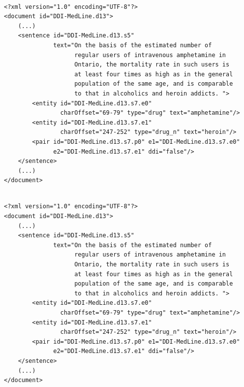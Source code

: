 \documentclass[xcolor={dvipsnames}]{beamer}
\begin{document}
\begin{frame}[fragile]{\insertsection}
\begin{verbatim}

<?xml version="1.0" encoding="UTF-8"?>
<document id="DDI-MedLine.d13">
    (...)
    <sentence id="DDI-MedLine.d13.s5" 
              text="On the basis of the estimated number of
                    regular users of intravenous amphetamine in
                    Ontario, the mortality rate in such users is 
                    at least four times as high as in the general 
                    population of the same age, and is comparable 
                    to that in alcoholics and heroin addicts. ">
        <entity id="DDI-MedLine.d13.s7.e0"
                charOffset="69-79" type="drug" text="amphetamine"/>
        <entity id="DDI-MedLine.d13.s7.e1"
                charOffset="247-252" type="drug_n" text="heroin"/>
        <pair id="DDI-MedLine.d13.s7.p0" e1="DDI-MedLine.d13.s7.e0"
              e2="DDI-MedLine.d13.s7.e1" ddi="false"/>
    </sentence>
    (...)
</document>

\end{verbatim}

\end{frame}

\begin{frame}[fragile]{\insertsection}
\begin{verbatim}

<?xml version="1.0" encoding="UTF-8"?>
<document id="DDI-MedLine.d13">
    (...)
    <sentence id="DDI-MedLine.d13.s5" 
              text="On the basis of the estimated number of
                    regular users of intravenous amphetamine in
                    Ontario, the mortality rate in such users is 
                    at least four times as high as in the general 
                    population of the same age, and is comparable 
                    to that in alcoholics and heroin addicts. ">
        <entity id="DDI-MedLine.d13.s7.e0"
                charOffset="69-79" type="drug" text="amphetamine"/>
        <entity id="DDI-MedLine.d13.s7.e1"
                charOffset="247-252" type="drug_n" text="heroin"/>
        <pair id="DDI-MedLine.d13.s7.p0" e1="DDI-MedLine.d13.s7.e0"
              e2="DDI-MedLine.d13.s7.e1" ddi="false"/>
    </sentence>
    (...)
</document>

\end{verbatim}

\end{frame}
\end{document}
